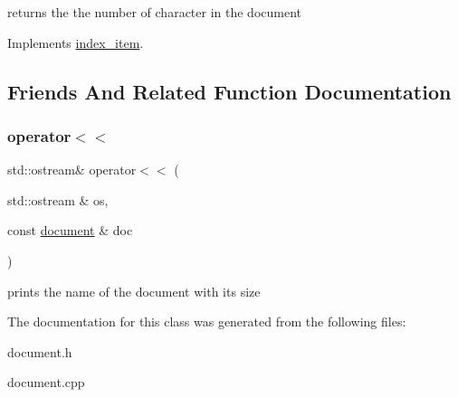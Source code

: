 returns the the number of character in the document 

Implements \hyperlink{classindex__item_a7c16d6bca513663fab66d40a6c0289a9}{index\+\_\+item}.



\subsection{Friends And Related Function Documentation}
\mbox{\label{classdocument_af474a7f5ba29bca5df031898e86a8687}} 
\subsubsection{\texorpdfstring{operator$<$$<$}{operator<<}}
{\footnotesize\ttfamily std\+::ostream\& operator$<$$<$ (\begin{DoxyParamCaption}\item[{std\+::ostream \&}]{os,  }\item[{const \hyperlink{classdocument}{document} \&}]{doc }\end{DoxyParamCaption})\hspace{0.3cm}{\ttfamily [friend]}}

prints the name of the document with its size 

The documentation for this class was generated from the following files\+:\begin{DoxyCompactItemize}
\item 
document.\+h\item 
document.\+cpp\end{DoxyCompactItemize}
